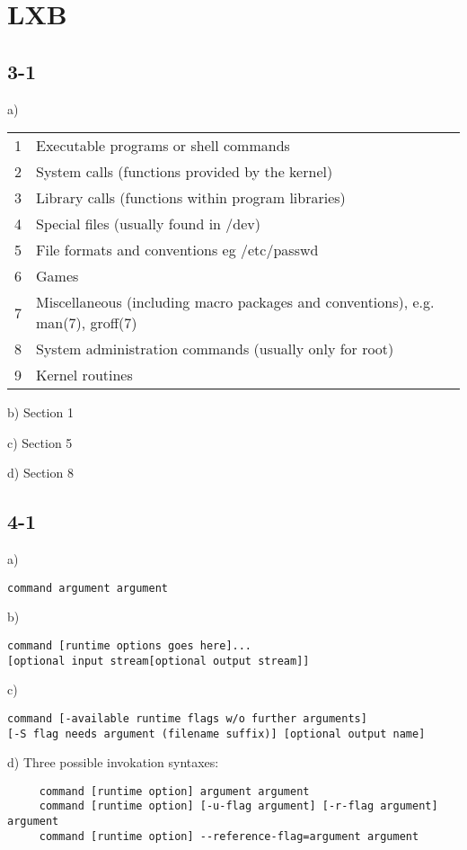 
\section{LXB}
\subsection{3-1}
a)

\begin{tabular}{ll}
1&   Executable programs or shell commands\\
2&   System calls (functions provided by the kernel)\\
3&   Library calls (functions within program libraries)\\
4&   Special files (usually found in /dev)\\
5&   File formats and conventions eg /etc/passwd\\
6&   Games\\
7&   Miscellaneous (including macro packages and conventions), e.g. man(7), groff(7)\\
8&   System administration commands (usually only for root)\\
9&   Kernel routines
\end{tabular}

b) Section 1

c) Section 5

d) Section 8

\subsection{4-1}
a) \begin{verbatim}command argument argument\end{verbatim}

b) \begin{verbatim}command [runtime options goes here]...
[optional input stream[optional output stream]]\end{verbatim}

c) \begin{verbatim}
command [-available runtime flags w/o further arguments]
[-S flag needs argument (filename suffix)] [optional output name]
\end{verbatim}


d) Three possible invokation syntaxes:
\begin{verbatim}
     command [runtime option] argument argument
     command [runtime option] [-u-flag argument] [-r-flag argument] argument
     command [runtime option] --reference-flag=argument argument
\end{verbatim}

